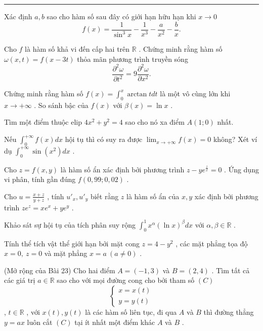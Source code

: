 \documentclass[14pt, a4paper]{extarticle}
\begin{document}

\vspace{2pt}
\noindent\rule{\textwidth}{0.5pt}

\Heading{\CalOne}{\CalOneCode}

 Xác định $a, b$ sao cho hàm số sau đây có giới hạn hữu hạn khi $x \to 0$
\[f(x) = \frac{1}{\sin^3 x} - \frac{1}{x^3} - \frac{a}{x^2} - \frac{b}{x}.\]

\vspace{0.3cm}
 Cho $f$ là hàm số khả vi đến cấp hai trên $\mathbb{R}$ . Chứng minh rằng hàm số $\omega(x, t) = f(x - 3t)$ thỏa mãn phương trình truyền sóng
\[\frac{\partial^2 \omega}{\partial t^2} = 9\frac{\partial^2 \omega}{\partial x^2}.\]

\vspace{0.3cm}
 Chứng minh rằng hàm số $f(x) = \int_0^x \arctan t dt$ là một vô cùng lớn khi $x \to +\infty$ . So sánh bậc của $f(x)$ với $\beta(x) = \ln x$ .

\vspace{0.5cm}
 Tìm một điểm thuộc elip $4x^2 + y^2 = 4$ sao cho nó xa điểm $A(1; 0)$ nhất.

\vspace{0.5cm}
 Nếu $\int_0^{+\infty} f(x)dx$ hội tụ thì có suy ra được $\lim_{x \to +\infty} f(x) = 0$ không? Xét ví dụ $\int_0^{+\infty} \sin(x^2)dx$ .

\vspace{0.5cm}
 Cho $z = f(x, y)$ là hàm số ẩn xác định bởi phương trình $z - ye^{\frac{z}{x}} = 0$ . Ứng dụng vi phân, tính gần đúng $f(0,99; 0,02)$ .

\vspace{0.5cm}
 Cho $u = \frac{x + z}{y + z}$ , tính $u'_x, u'_y$ biết rằng $z$ là hàm số ẩn của $x, y$ xác định bởi phương trình $z e^z = x e^x + y e^y$ .

\vspace{0.5cm}
 Khảo sát sự hội tụ của tích phân suy rộng $\int_0^1 x^\alpha(\ln x)^\beta dx$ với $\alpha, \beta \in \mathbb{R}$ .

\vspace{0.5cm}
 Tính thể tích vật thể giới hạn bởi mặt cong $z = 4 - y^2$ , các mặt phẳng tọa độ $x = 0,\ z = 0$ và mặt phẳng $x = a\ (a \neq 0)$ .

\vspace{0.5cm}
 (Mở rộng của Bài 23) Cho hai điểm $A = (-1, 3)$ và $B = (2, 4)$ . Tìm tất cả các giá trị $a \in \mathbb{R}$ sao cho với mọi đường cong cho bởi tham số $(C)$
\[\begin{cases} x = x(t) \\ y = y(t) \end{cases}\]
, $t \in \mathbb{R}$ , với $x(t), y(t)$ là các hàm số liên tục, đi qua $A$ và $B$ thì đường thẳng $y = ax$ luôn cắt $(C)$ tại ít nhất một điểm khác $A$ và $B$ .

\vspace{0.5cm}
\end{document}
